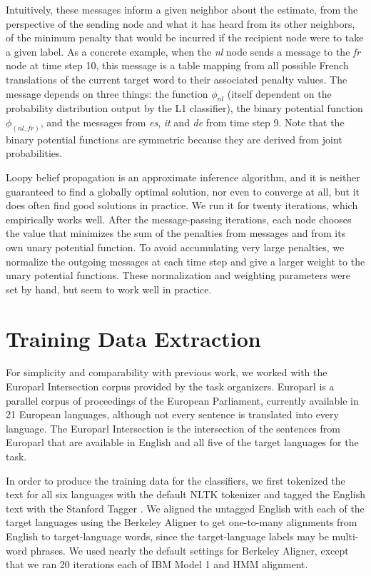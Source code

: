 \documentclass[11pt,letterpaper]{article}
\begin{document}
Intuitively, these messages inform a given neighbor about the estimate, from
the perspective of the sending node and what it has heard from its other
neighbors, of the minimum penalty that would be incurred if the recipient node
were to take a given label. As a concrete example, when the \emph{nl} node
sends a message to the \emph{fr} node at time step 10, this message is a table
mapping from all possible French translations of the current target word
to their associated penalty values. The message depends on three things: the
function $\phi_{nl}$ (itself dependent on the probability distribution output
by the L1 classifier), the binary potential function $\phi_{(nl,fr)}$, and the
messages from \emph{es}, \emph{it} and \emph{de} from time step 9.  Note that
the binary potential functions are symmetric because they are derived from
joint probabilities.

Loopy belief propagation is an approximate inference algorithm, and it is
neither guaranteed to find a globally optimal solution, nor even to converge at
all, but it does often find good solutions in practice. We run it for twenty
iterations, which empirically works well. After the message-passing iterations,
each node chooses the value that minimizes the sum of the penalties from
messages and from its own unary potential function. To avoid accumulating very
large penalties, we normalize the outgoing messages at each time step and give
a larger weight to the unary potential functions. These normalization and
weighting parameters were set by hand, but seem to work well in practice.

\section{Training Data Extraction}
\label{extraction}
For simplicity and comparability with previous work, we worked with the
Europarl Intersection corpus provided by the task organizers. Europarl
\cite{europarl} is a parallel corpus of proceedings of the European Parliament,
currently available in 21 European languages, although not every sentence is
translated into every language. The Europarl Intersection is the intersection
of the sentences from Europarl that are available in English and all five of
the target languages for the task.

In order to produce the training data for the classifiers, we first tokenized
the text for all six languages with the default NLTK tokenizer and tagged the
English text with the Stanford Tagger
\cite{Toutanova03feature-richpart-of-speech}. We aligned the untagged English
with each of the target languages using the Berkeley Aligner
\cite{denero-klein:2007:ACLMain} to get one-to-many alignments from English to
target-language words, since the target-language labels may be multi-word
phrases. We used nearly the default settings for Berkeley Aligner, except that
we ran 20 iterations each of IBM Model 1 and HMM alignment.
\end{document}
